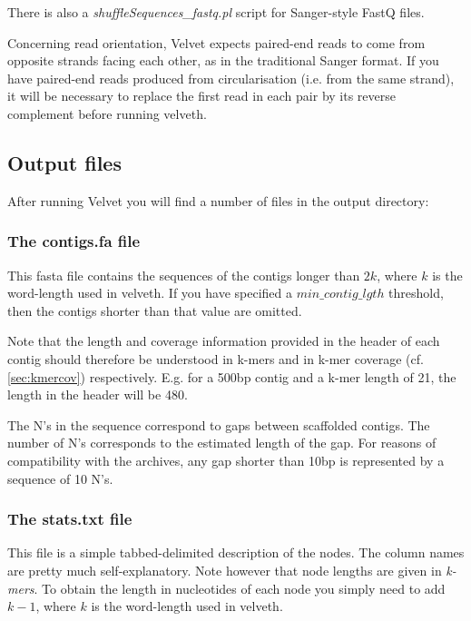 \documentclass{article}
\begin{document}
There is also a \emph{shuffleSequences\_fastq.pl} script for Sanger-style FastQ files.

Concerning read orientation, Velvet expects paired-end reads to come from opposite strands facing each other, as in the traditional Sanger format. If you have paired-end reads produced from circularisation (i.e. from the same strand), it will be necessary to replace the first read in each pair by its reverse complement before running velveth.

\subsection{Output files} 

\label{sec:output}

After running Velvet you will find a number of files in the output directory:

\subsubsection{The contigs.fa file}

\label{sec:fasta}

This fasta file contains the sequences of the contigs longer than $2k$, where $k$ is the word-length used in velveth. If you have specified a $min\_contig\_lgth$ threshold, then the contigs shorter than that value are omitted.

Note that the length and coverage information provided in the header of each contig should therefore be understood in k-mers and in k-mer coverage (cf. \ref{sec:kmercov}) respectively. E.g. for a 500bp contig and a k-mer length of 21, the length in the header will be 480.

The N's in the sequence correspond to gaps between scaffolded contigs. The number of N's corresponds to the estimated length of the gap. For reasons of compatibility with the archives, any gap shorter than 10bp is represented by a sequence of 10 N's.

\subsubsection{The stats.txt file}

\label{sec:stats}

This file is a simple tabbed-delimited description of the nodes. The column names are pretty much self-explanatory. Note however that node lengths are given in \emph{k-mers}. To obtain the length in nucleotides of each node you simply need to add $k-1$, where $k$ is the word-length used in velveth.
\end{document}
